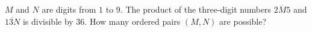$M$ and $N$ are digits from $1$ to $9$. The product of the three-digit numbers $\overline{2M5}$ and $\overline{13N}$ is divisible by $36$. How many ordered pairs $(M,N)$ are possible?
